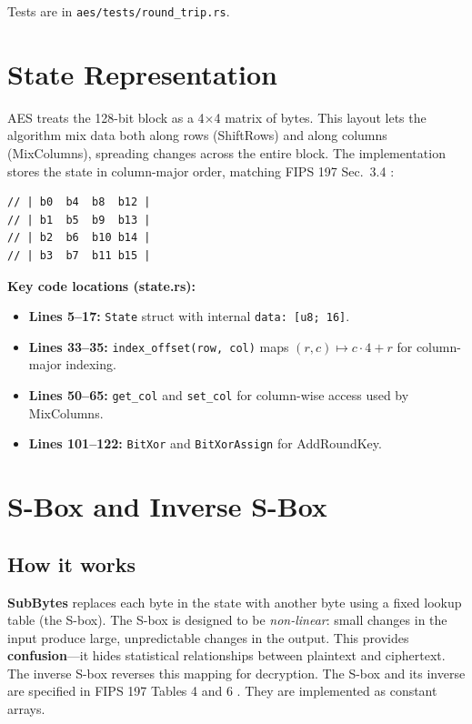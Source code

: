 \documentclass[11pt]{article}
\begin{document}
Tests are in \texttt{aes/tests/round\_trip.rs}.

\section{State Representation}

AES treats the 128-bit block as a 4$\times$4 matrix of bytes. This layout lets the algorithm mix data both along rows (ShiftRows) and along columns (MixColumns), spreading changes across the entire block. The implementation stores the state in column-major order, matching FIPS 197 Sec.\ 3.4 \cite{NIST2001}:

\begin{lstlisting}[caption=state.rs: bytes b0--b15 arranged as a 4x4 matrix]
// | b0  b4  b8  b12 |
// | b1  b5  b9  b13 |
// | b2  b6  b10 b14 |
// | b3  b7  b11 b15 |
\end{lstlisting}

\textbf{Key code locations (state.rs):}
\begin{itemize}
    \item \textbf{Lines 5--17:} \texttt{State} struct with internal \texttt{data: [u8; 16]}.
    \item \textbf{Lines 33--35:} \texttt{index\_offset(row, col)} maps $(r,c) \mapsto c \cdot 4 + r$ for column-major indexing.
    \item \textbf{Lines 50--65:} \texttt{get\_col} and \texttt{set\_col} for column-wise access used by MixColumns.
    \item \textbf{Lines 101--122:} \texttt{BitXor} and \texttt{BitXorAssign} for AddRoundKey.
\end{itemize}

\section{S-Box and Inverse S-Box}

\subsection*{How it works}

\textbf{SubBytes} replaces each byte in the state with another byte using a fixed lookup table (the S-box). The S-box is designed to be \emph{non-linear}: small changes in the input produce large, unpredictable changes in the output. This provides \textbf{confusion}---it hides statistical relationships between plaintext and ciphertext. The inverse S-box reverses this mapping for decryption. The S-box and its inverse are specified in FIPS 197 Tables 4 and 6 \cite{NIST2001}. They are implemented as constant arrays.
\end{document}
